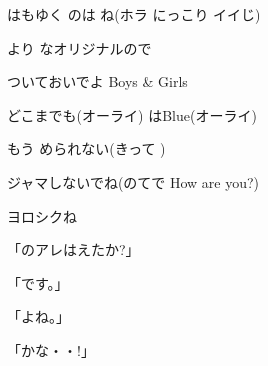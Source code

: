 \documentclass[14pt]{ltjsarticle}
\begin{document}
{  はもゆく のは ね(ホラ にっこり イイじ)
  \jisho{}

  より なオリジナルので
  \jisho{}

  ついておいでよ Boys \& Girls
  \jisho{}

  どこまでも(オーライ) はBlue(オーライ)
  \jisho{}

  もう められない(きって )
  \jisho{}

  ジャマしないでね(のてで How are you?)
  \jisho{}

  ヨロシクね
  \jisho{}

\item
  「のアレはえたか?」
  \jisho{}

  「です。」
  \jisho{}

  「よね。」
  \jisho{}

  「かな・・!」
  \jisho{}

}
\end{document}
